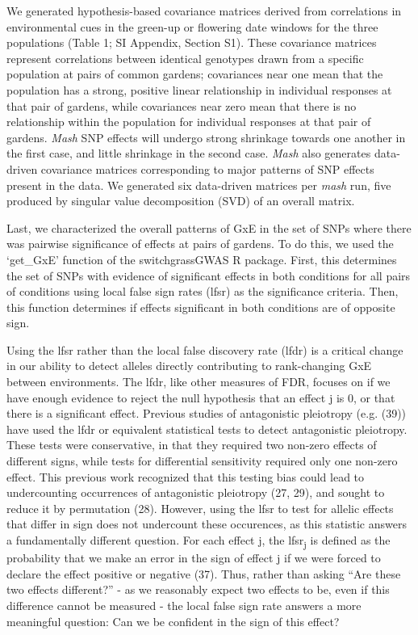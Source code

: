 \documentclass[
  9pt,
  twocolumn,
  twoside]{pnas-new}
\begin{document}
We generated hypothesis-based covariance matrices derived from
correlations in environmental cues in the green-up or flowering date
windows for the three populations (Table 1; SI Appendix, Section S1).
These covariance matrices represent correlations between identical
genotypes drawn from a specific population at pairs of common gardens;
covariances near one mean that the population has a strong, positive
linear relationship in individual responses at that pair of gardens,
while covariances near zero mean that there is no relationship within
the population for individual responses at that pair of gardens.
\emph{Mash} SNP effects will undergo strong shrinkage towards one
another in the first case, and little shrinkage in the second case.
\emph{Mash} also generates data-driven covariance matrices corresponding
to major patterns of SNP effects present in the data. We generated six
data-driven matrices per \emph{mash} run, five produced by singular
value decomposition (SVD) of an overall matrix.

Last, we characterized the overall patterns of GxE in the set of SNPs
where there was pairwise significance of effects at pairs of gardens. To
do this, we used the `get\_GxE' function of the switchgrassGWAS R
package. First, this determines the set of SNPs with evidence of
significant effects in both conditions for all pairs of conditions using
local false sign rates (lfsr) as the significance criteria. Then, this
function determines if effects significant in both conditions are of
opposite sign.

Using the lfsr rather than the local false discovery rate (lfdr) is a
critical change in our ability to detect alleles directly contributing
to rank-changing GxE between environments. The lfdr, like other measures
of FDR, focuses on if we have enough evidence to reject the null
hypothesis that an effect j is 0, or that there is a significant effect.
Previous studies of antagonistic pleiotropy (e.g. (39)) have used the
lfdr or equivalent statistical tests to detect antagonistic pleiotropy.
These tests were conservative, in that they required two non-zero
effects of different signs, while tests for differential sensitivity
required only one non-zero effect. This previous work recognized that
this testing bias could lead to undercounting occurrences of
antagonistic pleiotropy (27, 29), and sought to reduce it by permutation
(28). However, using the lfsr to test for allelic effects that differ in
sign does not undercount these occurences, as this statistic answers a
fundamentally different question. For each effect j, the
lfsr\textsubscript{j} is defined as the probability that we make an
error in the sign of effect j if we were forced to declare the effect
positive or negative (37). Thus, rather than asking ``Are these two
effects different?'' - as we reasonably expect two effects to be, even
if this difference cannot be measured - the local false sign rate
answers a more meaningful question: Can we be confident in the sign of
this effect?
\end{document}
